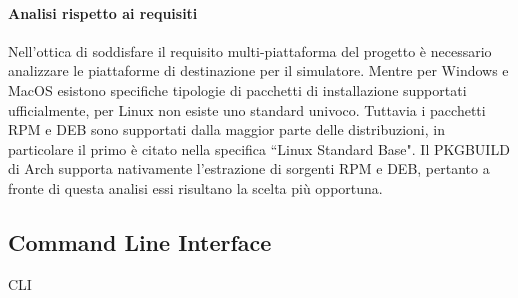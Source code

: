 \paragraph{Analisi rispetto ai requisiti}
Nell'ottica di soddisfare il requisito multi-piattaforma del progetto è necessario analizzare le piattaforme di destinazione per il simulatore. Mentre per Windows e MacOS esistono specifiche tipologie di pacchetti di installazione supportati ufficialmente, per Linux non esiste uno standard univoco. Tuttavia  i pacchetti RPM e DEB sono supportati dalla maggior parte delle distribuzioni, in particolare il primo è citato nella specifica ``Linux Standard Base". Il PKGBUILD di Arch supporta nativamente l'estrazione di sorgenti RPM e DEB, pertanto a fronte di questa analisi essi risultano la scelta più opportuna.

\subsection{Command Line Interface} 

CLI